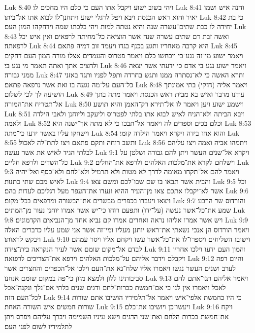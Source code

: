 Luk 8:40  ויהי בשוב ישוע ויקבל אתו העם כי כלם היו מחכים לו׃
Luk 8:41  והנה איש ושמו יאיר והוא ראש הכנסת ויבא ויפל לרגלי ישוע ויתחנן־לו לבוא אתו אל־ביתו׃
Luk 8:42  כי בת יחידה לו כבת שתים־עשרה שנה והיא נטתה למות ויהי בלכתו שמה וידחקהו המון העם׃
Luk 8:43  ואשה זבת דם שתים עשרה שנה אשר הוציאה כל־מחיתה לרפאים ואין איש יכל לרפאתה׃
Luk 8:44  היא קרבה מאחריו ותגע בכנף בגדו ויעמד זוב דמיה פתאם׃
Luk 8:45  ויאמר ישוע מי־זה נגע־בי ויכחשו כלם ויאמר פטרוס והעמדים אצלו מורה המון העם דחקים ולחצים אתך ואתה תאמר מי נגע בי׃
Luk 8:46  ויאמר ישוע נגע בי אדם כי ידעתי אשר יצאה ממני גבורה׃
Luk 8:47  ותרא האשה כי לא־נסתרה ממנו ותגש בחרדה ותפל לפניו ותגד באזני כל־העם על־מה נגעה בו ואת אשר נרפאה פתאם׃
Luk 8:48  ויאמר אליה (חזקי) בתי אמונתך הושיעה לך לכי לשלום׃
Luk 8:49  עודנו מדבר ואיש בא מבית ראש הכנסת ויאמר מתה בתך אל־תטריח את־המורה׃
Luk 8:50  וישמע ישוע ויען ויאמר לו אל־תירא רק־האמן והיא תושע׃
Luk 8:51  ויבא הביתה ולא־הניח לאיש לבוא אתו בלתי לפטרוס וליעקב וליוחנן ולאבי הילדה ולאמה׃
Luk 8:52  וכלם בכים וספדים לה ויאמר אל־תבכו כי לא מתה אך־ישנה היא׃
Luk 8:53  וישחקו עליו באשר ידעו כי־מתה׃
Luk 8:54  והוא אחז בידה ויקרא ויאמר הילדה קומי׃
Luk 8:55  ותשב רוחה ותקם פתאם ויצו לתת־לה לאכול׃
Luk 8:56  ויתמהו אביה ואמה ויצו עליהם לבלתי הגיד לאיש את אשר נעשה׃
Luk 9:1  ויקרא אל־שנים העשר ויתן להם גבורה ושלטן על כל־השדים ולרפא חליים׃
Luk 9:2  וישלחם לקרא את־מלכות האלהים ולרפא את־החלים׃
Luk 9:3  ויאמר להם אל־תקחו מאומה לדרך לא מטות ולא תרמיל ולא־לחם ולא־כסף ואל־יהיה לאיש מכם שתי כתנות׃
Luk 9:4  והבית אשר תבאו בו שם שבו־לכם ומשם צאו׃
Luk 9:5  וכל אשר לא־יקבלו אתכם צאו מן־העיר ההיא ונערו את־העפר מעל רגליכם לעדות בהם׃
Luk 9:6  ויצאו ויעברו בכפרים מבשרים את־הבשורה ומרפאים בכל־מקום׃
Luk 9:7  והורדוס שר הרבע שמע את־כל־אשר נעשה (על־ידו) ותפעם רוחו כי־יש אשר אמרו יוחנן נעור מן־המתים׃
Luk 9:8  ויש אשר אמרו אליהו נראה ואחרים אמרו קם נביא אחד מן־הנביאים הקדמונים׃
Luk 9:9  ויאמר הורדוס הן אנכי נשאתי את־ראש יוחנן מעליו ומי־זה אשר אני שמע עליו כדברים האלה ויבקש לראותו׃
Luk 9:10  וישובו השליחים ויספרו־לו את־כל־אשר עשו ויקחם אליו ויסר עמהם לבדם אל־מקום שומם אשר לעיר הנקראה בית־צידה׃
Luk 9:11  והמון העם ידעו וילכו אחריו ויקבלם וידבר אליהם על־מלכות האלהים וירפא את־הצריכים לרפואה׃
Luk 9:12  והיום רפה לערב ושנים העשר נגשו ויאמרו אליו שלח־נא את־העם וילכו אל־הכפרים והחצרים אשר סביבותינו ללון ולמצא מזון כי־פה במקום שומם אנחנו׃
Luk 9:13  ויאמר אליהם תנו־אתם להם לאכל ויאמרו אין לנו כי אם־חמשת ככרות־לחם ודגים שנים בלתי אם־נלך ונקנה־אכל לכל־העם הזה׃
Luk 9:14  כי היו כחמשת אלפי־איש ויאמר אל־תלמידיו הושיבו אתם שורות שורות חמשים איש השורה האחת׃
Luk 9:15  ויעשו־כן ויושיבו את־כלם׃
Luk 9:16  ויקח את־חמשת ככרות הלחם ואת־שני הדגים וישא עיניו השמימה ויברך עליהם ויפרס ויתן לתלמידיו לשום לפני העם׃

